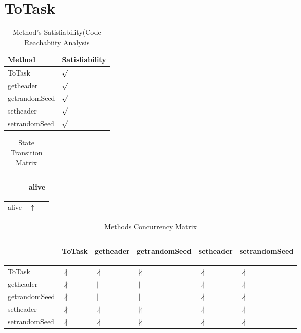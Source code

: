 \documentclass[10pt]{article}
\begin{document}
\section{{\color{Fuchsia}ToTask}}
\label{ToTask}
\begin{longtable}{|l|l|}
\caption{Method's Satisfiability(Code Reachabiity Analysis}\\
\hline
Method & Satisfiability\\
\hline
ToTask&{\color{blue}$\surd$}\\
\hline
getheader&{\color{blue}$\surd$}\\
\hline
getrandomSeed&{\color{blue}$\surd$}\\
\hline
setheader&{\color{blue}$\surd$}\\
\hline
setrandomSeed&{\color{blue}$\surd$}\\
\hline
\end{longtable}
\begin{longtable}{|l|l|}
\caption{State Transition Matrix}\\
\hline
&\begin{sideways}alive\end{sideways}\\
\hline
alive&{\color{blue}$\uparrow$}\\
\hline
\end{longtable}
\begin{longtable}{|l|l|l|l|l|l|}
\caption{Methods Concurrency Matrix}\\
\hline
&\begin{sideways}ToTask\end{sideways}&\begin{sideways}getheader\end{sideways}&\begin{sideways}getrandomSeed\end{sideways}&\begin{sideways}setheader\end{sideways}&\begin{sideways}setrandomSeed\end{sideways}\\
\hline
ToTask&{\color{BrickRed}$\nparallel$}&{\color{BrickRed}$\nparallel$}&{\color{BrickRed}$\nparallel$}&{\color{BrickRed}$\nparallel$}&{\color{BrickRed}$\nparallel$}\\
\hline
getheader&{\color{BrickRed}$\nparallel$}&{\color{blue}$\parallel$}&{\color{blue}$\parallel$}&{\color{BrickRed}$\nparallel$}&{\color{BrickRed}$\nparallel$}\\
\hline
getrandomSeed&{\color{BrickRed}$\nparallel$}&{\color{blue}$\parallel$}&{\color{blue}$\parallel$}&{\color{BrickRed}$\nparallel$}&{\color{BrickRed}$\nparallel$}\\
\hline
setheader&{\color{BrickRed}$\nparallel$}&{\color{BrickRed}$\nparallel$}&{\color{BrickRed}$\nparallel$}&{\color{BrickRed}$\nparallel$}&{\color{BrickRed}$\nparallel$}\\
\hline
setrandomSeed&{\color{BrickRed}$\nparallel$}&{\color{BrickRed}$\nparallel$}&{\color{BrickRed}$\nparallel$}&{\color{BrickRed}$\nparallel$}&{\color{BrickRed}$\nparallel$}\\
\hline
\end{longtable}
\newpage
\end{document}
